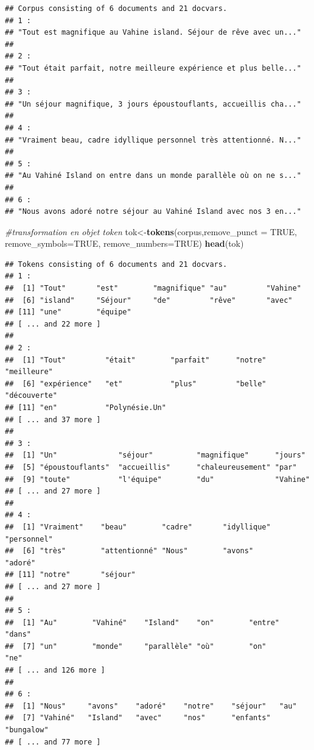 \documentclass[
]{book}
\newenvironment{Shaded}{\begin{snugshade}}{\end{snugshade}}
\newcommand{\CommentTok}[1]{\textcolor[rgb]{0.56,0.35,0.01}{\textit{#1}}}
\newcommand{\DataTypeTok}[1]{\textcolor[rgb]{0.13,0.29,0.53}{#1}}
\newcommand{\KeywordTok}[1]{\textcolor[rgb]{0.13,0.29,0.53}{\textbf{#1}}}
\newcommand{\NormalTok}[1]{#1}
\newcommand{\OtherTok}[1]{\textcolor[rgb]{0.56,0.35,0.01}{#1}}
\begin{document}
\begin{verbatim}
## Corpus consisting of 6 documents and 21 docvars.
## 1 :
## "Tout est magnifique au Vahine island. Séjour de rêve avec un..."
## 
## 2 :
## "Tout était parfait, notre meilleure expérience et plus belle..."
## 
## 3 :
## "Un séjour magnifique, 3 jours époustouflants, accueillis cha..."
## 
## 4 :
## "Vraiment beau, cadre idyllique personnel très attentionné. N..."
## 
## 5 :
## "Au Vahiné Island on entre dans un monde parallèle où on ne s..."
## 
## 6 :
## "Nous avons adoré notre séjour au Vahiné Island avec nos 3 en..."
\end{verbatim}

\begin{Shaded}
\begin{Highlighting}[]
\CommentTok{#transformation en objet token}
\NormalTok{tok<-}\KeywordTok{tokens}\NormalTok{(corpus,}\DataTypeTok{remove_punct =} \OtherTok{TRUE}\NormalTok{, }\DataTypeTok{remove_symbols=}\OtherTok{TRUE}\NormalTok{, }\DataTypeTok{remove_numbers=}\OtherTok{TRUE}\NormalTok{)}
\KeywordTok{head}\NormalTok{(tok)}
\end{Highlighting}
\end{Shaded}

\begin{verbatim}
## Tokens consisting of 6 documents and 21 docvars.
## 1 :
##  [1] "Tout"       "est"        "magnifique" "au"         "Vahine"    
##  [6] "island"     "Séjour"     "de"         "rêve"       "avec"      
## [11] "une"        "équipe"    
## [ ... and 22 more ]
## 
## 2 :
##  [1] "Tout"         "était"        "parfait"      "notre"        "meilleure"   
##  [6] "expérience"   "et"           "plus"         "belle"        "découverte"  
## [11] "en"           "Polynésie.Un"
## [ ... and 37 more ]
## 
## 3 :
##  [1] "Un"              "séjour"          "magnifique"      "jours"          
##  [5] "époustouflants"  "accueillis"      "chaleureusement" "par"            
##  [9] "toute"           "l'équipe"        "du"              "Vahine"         
## [ ... and 27 more ]
## 
## 4 :
##  [1] "Vraiment"    "beau"        "cadre"       "idyllique"   "personnel"  
##  [6] "très"        "attentionné" "Nous"        "avons"       "adoré"      
## [11] "notre"       "séjour"     
## [ ... and 27 more ]
## 
## 5 :
##  [1] "Au"        "Vahiné"    "Island"    "on"        "entre"     "dans"     
##  [7] "un"        "monde"     "parallèle" "où"        "on"        "ne"       
## [ ... and 126 more ]
## 
## 6 :
##  [1] "Nous"     "avons"    "adoré"    "notre"    "séjour"   "au"      
##  [7] "Vahiné"   "Island"   "avec"     "nos"      "enfants"  "bungalow"
## [ ... and 77 more ]
\end{verbatim}
\end{document}
